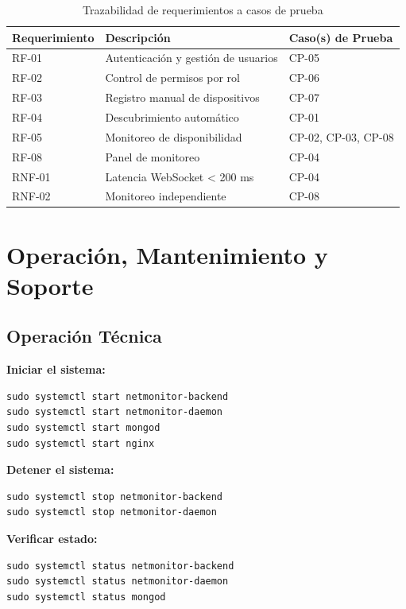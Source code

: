 \documentclass[12pt,a4paper]{report}
\begin{document}
\begin{table}[htbp]
\centering
\caption{Trazabilidad de requerimientos a casos de prueba}\label{tab:trazabilidad}
\small
\begin{tabularx}{\textwidth}{p{2.8cm} p{5.0cm} X}
\toprule
\textbf{Requerimiento} & \textbf{Descripción} & \textbf{Caso(s) de Prueba} \\
\midrule
RF-01 & Autenticación y gestión de usuarios & CP-05 \\
RF-02 & Control de permisos por rol & CP-06 \\
RF-03 & Registro manual de dispositivos & CP-07 \\
RF-04 & Descubrimiento automático & CP-01 \\
RF-05 & Monitoreo de disponibilidad & CP-02, CP-03, CP-08 \\
RF-08 & Panel de monitoreo & CP-04 \\
RNF-01 & Latencia WebSocket < 200 ms & CP-04 \\
RNF-02 & Monitoreo independiente & CP-08 \\
\bottomrule
\end{tabularx}
\end{table}

\chapter{Operación, Mantenimiento y Soporte}

\section{Operación Técnica}

\textbf{Iniciar el sistema:}
\begin{lstlisting}
sudo systemctl start netmonitor-backend
sudo systemctl start netmonitor-daemon
sudo systemctl start mongod
sudo systemctl start nginx
\end{lstlisting}

\textbf{Detener el sistema:}
\begin{lstlisting}
sudo systemctl stop netmonitor-backend
sudo systemctl stop netmonitor-daemon
\end{lstlisting}

\textbf{Verificar estado:}
\begin{lstlisting}
sudo systemctl status netmonitor-backend
sudo systemctl status netmonitor-daemon
sudo systemctl status mongod
\end{lstlisting}
\end{document}
